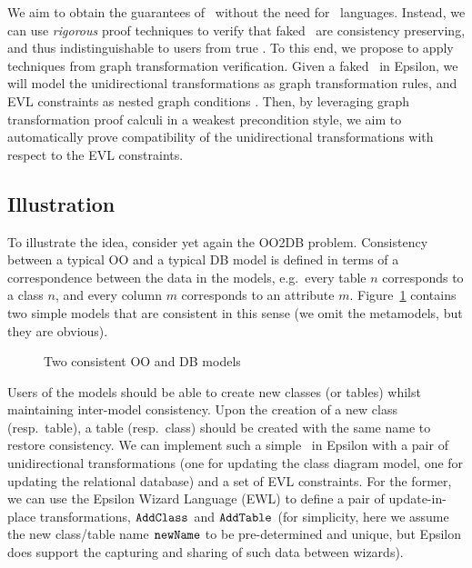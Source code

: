 We aim to obtain the guarantees of \BX\ without
the need for \BX\ languages. Instead, we can use \emph{rigorous} proof
techniques to verify that faked \BX\ are consistency preserving, and thus
indistinguishable to users from true \BX. To this end, we propose to apply
techniques from graph transformation verification. Given a faked \BX\ in
Epsilon, we will model the unidirectional transformations as graph
transformation rules, and EVL constraints as nested graph conditions
\cite{Habel-Pennemann09a}. Then, by leveraging graph transformation proof
calculi \cite{Habel-Pennemann-Rensink06a,Poskitt13a,Poskitt-Plump12a} in a
weakest precondition style, we aim to automatically prove compatibility of the
unidirectional transformations with respect to the EVL
constraints. 

\subsection{Illustration}
To illustrate the idea, consider yet again the OO2DB problem. Consistency between a typical OO and a typical DB model is defined in terms of a correspondence between the data in the models, e.g.\ every table $n$ corresponds to a class $n$, and every column $m$ corresponds to an attribute $m$. Figure~\ref{fig:cd2rdbm_example} contains two simple models that are consistent in this sense (we omit the metamodels, but they are obvious).	

\begin{figure}[htbp]
\caption{Two consistent OO and DB models}
\label{fig:cd2rdbm_example}
\end{figure}

	
	Users of the models should be able to create new classes (or tables) whilst maintaining inter-model consistency. Upon the creation of a new class (resp.\ table), a table (resp.\ class) should be created with the same name to restore consistency. We can implement such a simple \BX\ in Epsilon with a pair of unidirectional transformations (one for updating the class diagram model, one for updating the relational database) and a set of EVL constraints. For the former, we can use the Epsilon Wizard Language (EWL) to define a pair of update-in-place transformations, $\tt AddClass$ and $\tt AddTable$ (for simplicity, here we assume the new class/table name $\tt newName$ to be pre-determined and unique, but Epsilon does support the capturing and sharing of such data between wizards).
	
